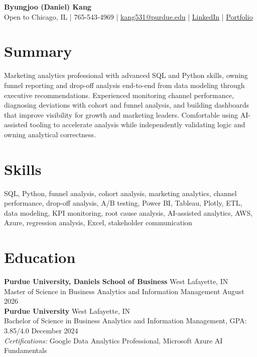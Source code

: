 \documentclass[11pt,a4paper]{article}
\begin{document}
\pagestyle{empty}

\begin{center}
    {\Huge \textbf{Byungjoo (Daniel) Kang}} \\[4pt]
    Open to Chicago, IL | 765-543-4969 | \href{mailto:kang531@purdue.edu}{kang531@purdue.edu} |
    \href{https://www.linkedin.com/in/daniel-byungjoo-kang/}{LinkedIn} | \href{https://daniel-kang-vs.github.io}{Portfolio}
\end{center}

\section*{Summary}
Marketing analytics professional with advanced SQL and Python skills, owning funnel reporting and drop-off analysis end-to-end from data modeling through executive recommendations. Experienced monitoring channel performance, diagnosing deviations with cohort and funnel analysis, and building dashboards that improve visibility for growth and marketing leaders. Comfortable using AI-assisted tooling to accelerate analysis while independently validating logic and owning analytical correctness.

\section*{Skills}
SQL, Python, funnel analysis, cohort analysis, marketing analytics, channel performance, drop-off analysis, A/B testing, Power BI, Tableau, Plotly, ETL, data modeling, KPI monitoring, root cause analysis, AI-assisted analytics, AWS, Azure, regression analysis, Excel, stakeholder communication

\section*{Education}
\noindent
\textbf{Purdue University, Daniels School of Business} \hfill West Lafayette, IN \\
Master of Science in Business Analytics and Information Management \hfill August 2026 \\[6pt]
\textbf{Purdue University} \hfill West Lafayette, IN \\
Bachelor of Science in Business Analytics and Information Management, GPA: 3.85/4.0 \hfill December 2024 \\
\textit{Certifications:} Google Data Analytics Professional, Microsoft Azure AI Fundamentals
\end{document}
